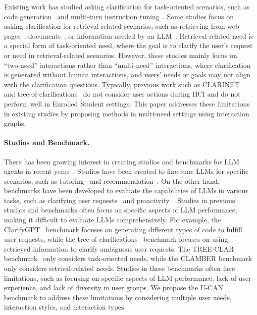 Existing work has studied asking clarification for task-oriented scenarios, such as code generation~\citep{clarifygpt, treewalker, benchmark_code_generate} and multi-turn instruction tuning~\citep{proactive_cot, rethink_rephrase}. Some studies focus on asking clarification for retrieval-related scenarios, such as retrieving from web pages~\citep{clarinet}, documents~\citep{multiturn_clarification}, or information needed by an LLM~\citep{inscit, star_gate, learn_to_clarify}. Retrieval-related need is a special form of task-oriented need, where the goal is to clarify the user's request or need in retrieval-related scenarios. However, these studies mainly focus on ``two-need'' interactions rather than ``multi-need'' interactions, where clarification is generated without human interactions, and users' needs or goals may not align with the clarification questions. Typically, previous work such as CLARINET~\citep{clarinet} and tree-of-clarifications~\citep{tree_of_clarifications} do not consider user actions during HCI and do not perform well in Enrolled Student settings. This paper addresses these limitations in existing studies by proposing methods in multi-need settings using interaction graphs.

\paragraph{Studios and Benchmark.}
There has been growing interest in creating studios and benchmarks for LLM agents in recent years~\citep{proactive_agents,proactive_cot,rethink_rephrase,pacific,neural_approach,ppdpp,retailAgent,into_the_unknown,rethink_rephrase,agentboard,mt_survey,rlhf,rlaif,multiturn_rlhf,archer,refuel,dpo,lmrl,beyond_goldfish_memory,mteval,g_eval,style,gpt_path,mt_evaluation}.
Studios have been created to fine-tune LLMs for specific scenarios, such as tutoring~\citep{baize} and recommendation~\citep{interactive_path_reasoning}. On the other hand, benchmarks have been developed to evaluate the capabilities of LLMs in various tasks, such as clarifying user requests~\citep{clarinet,clarify_when_necessary,learn_to_clarify,tree_of_clarifications} and proactivity~\citep{proactive_cot,mixed_initiative_dialogue}. Studies in previous studios and benchmarks often focus on specific aspects of LLM performance, making it difficult to evaluate LLMs comprehensively. For example, the ClarifyGPT~\citep{clarifygpt} benchmark focuses on generating different types of code to fulfill user requests, while the tree-of-clarifications~\citep{tree_of_clarifications} benchmark focuses on using retrieved information to clarify ambiguous user requests. The TREE-CLAR benchmark~\citep{tree_of_clarifications} only considers task-oriented needs, while the CLAMBER benchmark only considers retrival-related needs. Studies in these benchmarks often face limitations, such as focusing on specific aspects of LLM performance, lack of user experience, and lack of diversity in user groups. We propose the U-CAN benchmark to address these limitations by considering multiple user needs, interaction styles, and interaction types.



